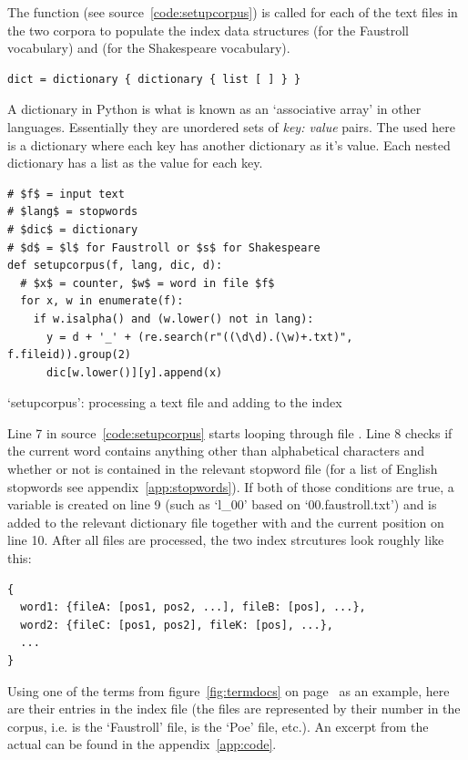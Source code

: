 The  function (see source~\ref{code:setupcorpus}) is called for each of the text files in the two corpora to populate the index data structures  (for the Faustroll vocabulary) and  (for the Shakespeare vocabulary).

\begin{verbatim}
dict = dictionary { dictionary { list [ ] } }
\end{verbatim}

A dictionary in Python is what is known as an `associative array' in other languages. Essentially they are unordered sets of \emph{key: value} pairs. The  used here is a dictionary where each key has another dictionary as it's value. Each nested dictionary has a list as the value for each key.

\begin{listing}
  \begin{verbatim}
# $f$ = input text
# $lang$ = stopwords
# $dic$ = dictionary
# $d$ = $l$ for Faustroll or $s$ for Shakespeare
def setupcorpus(f, lang, dic, d):
  # $x$ = counter, $w$ = word in file $f$
  for x, w in enumerate(f):
    if w.isalpha() and (w.lower() not in lang):
      y = d + '_' + (re.search(r"((\d\d).(\w)+.txt)", f.fileid)).group(2)
      dic[w.lower()][y].append(x)
  \end{verbatim}
\caption[`setupcorpus' function]{`setupcorpus': processing a text file and adding to the index}
\label{code:setupcorpus}
\end{listing}

Line 7 in source~\ref{code:setupcorpus} starts looping through file . Line 8 checks if the current word  contains anything other than alphabetical characters and whether or not  is contained in the relevant stopword file  (for a list of English stopwords see appendix~\ref{app:stopwords}). If both of those conditions are true, a variable  is created on line \num{9} (such as `l\_00' based on `00.faustroll.txt') and  is added to the relevant dictionary file  together with  and the current position  on line 10. After all files are processed, the two index strcutures look roughly like this:

\begin{verbatim}
{
  word1: {fileA: [pos1, pos2, ...], fileB: [pos], ...},
  word2: {fileC: [pos1, pos2], fileK: [pos], ...},
  ...
}
\end{verbatim}

Using one of the terms from figure~\ref{fig:termdocs} on page~\pageref{fig:termdocs} as an example, here are their entries in the index file (the files are represented by their number in the corpus, i.e.  is the `Faustroll' file,  is the `Poe' file, etc.). An excerpt from the actual  can be found in the appendix~\ref{app:code}.

